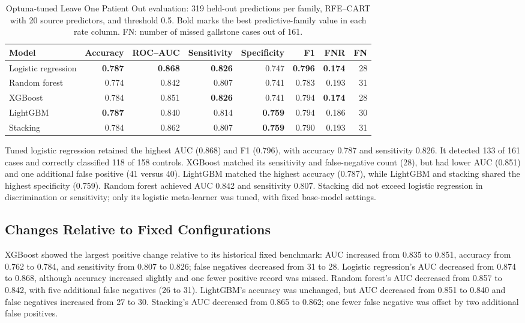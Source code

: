 \begin{table}[tbp]
\centering
\footnotesize
\setlength{\tabcolsep}{4pt}
\caption{Optuna-tuned Leave One Patient Out evaluation: 319 held-out predictions per family, RFE--CART with 20 source predictors, and threshold 0.5. Bold marks the best predictive-family value in each rate column. FN: number of missed gallstone cases out of 161.}
\label{tab:tuned-lopo-results}
\begin{tabular}{@{}lrrrrrrr@{}}
\toprule
Model & Accuracy & ROC--AUC & Sensitivity & Specificity & F1 & FNR & FN \\
\midrule
Logistic regression & \textbf{0.787} & \textbf{0.868} & \textbf{0.826} & 0.747 & \textbf{0.796} & \textbf{0.174} & 28 \\
Random forest & 0.774 & 0.842 & 0.807 & 0.741 & 0.783 & 0.193 & 31 \\
XGBoost & 0.784 & 0.851 & \textbf{0.826} & 0.741 & 0.794 & \textbf{0.174} & 28 \\
LightGBM & \textbf{0.787} & 0.840 & 0.814 & \textbf{0.759} & 0.794 & 0.186 & 30 \\
Stacking & 0.784 & 0.862 & 0.807 & \textbf{0.759} & 0.790 & 0.193 & 31 \\
\bottomrule
\end{tabular}
\end{table}

Tuned logistic regression retained the highest AUC (0.868) and F1 (0.796), with accuracy 0.787 and sensitivity 0.826. It detected 133 of 161 cases and correctly classified 118 of 158 controls. XGBoost matched its sensitivity and false-negative count (28), but had lower AUC (0.851) and one additional false positive (41 versus 40). LightGBM matched the highest accuracy (0.787), while LightGBM and stacking shared the highest specificity (0.759). Random forest achieved AUC 0.842 and sensitivity 0.807. Stacking did not exceed logistic regression in discrimination or sensitivity; only its logistic meta-learner was tuned, with fixed base-model settings.

\subsection{Changes Relative to Fixed Configurations}
XGBoost showed the largest positive change relative to its historical fixed benchmark: AUC increased from 0.835 to 0.851, accuracy from 0.762 to 0.784, and sensitivity from 0.807 to 0.826; false negatives decreased from 31 to 28. Logistic regression's AUC decreased from 0.874 to 0.868, although accuracy increased slightly and one fewer positive record was missed. Random forest's AUC decreased from 0.857 to 0.842, with five additional false negatives (26 to 31). LightGBM's accuracy was unchanged, but AUC decreased from 0.851 to 0.840 and false negatives increased from 27 to 30. Stacking's AUC decreased from 0.865 to 0.862; one fewer false negative was offset by two additional false positives.

